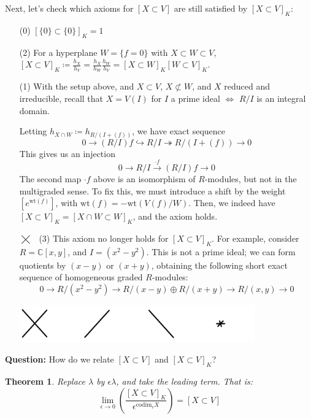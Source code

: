 \documentclass[12pt]{amsart}
\numberwithin{equation}{section}
\newtheorem{Theorem}[equation]{Theorem}
\theoremstyle{definition}
\numberwithin{figure}{section}
\newcommand{\wt}{\text{wt}}
\newcommand{\C}{\mathbb{C}}
\begin{document}
\noindent Next, let's check which axioms for $[X \subset V]$ are still satisfied by $[X \subset V]_K$:
\begin{enumerate}
    \item[\checkmark (0)] $[\{0\} \subset \{0\}]_K = 1$
    \item [\checkmark (2)] For a hyperplane $W = \{f=0\}$ with $X \subset W \subset V$, $[X \subset V]_K \coloneqq \frac{h_X}{h_V} = \frac{h_X}{h_W} \frac{h_W}{h_V} = [X \subset W]_K [W \subset V]_K$.
    \item[\checkmark (1)] With the setup above, and $X \subset V$, $X \not \subset W$, and $X$ reduced and irreducible, recall that $X = V(I)$ for $I$ a prime ideal $\iff$ $R/I$ is an integral domain.
    
    Letting $h_{X \cap W} \coloneqq h_{R/(I+(f))}$, we have exact sequence
    $$ 0 \to (R/I)f \hookrightarrow R/I \twoheadrightarrow R/(I + (f)) \to 0 $$
    This gives us an injection
    $$ 0 \to R/I \stackrel{\cdot f}{\to} (R/I)f \to 0 $$
    The second map $\cdot f$ above is an isomorphism of $R$-modules, but not in the multigraded sense. To fix this, we must introduce a shift by the weight $[e^{\wt(f)}]$, with $\wt(f) = -\wt(V(f)/W)$.
    Then, we indeed have $[X \subset V]_K = [X \cap W \subset W]_K$, and the axiom holds.
    
    \item[$\bigtimes$ \, (3)] This axiom no longer holds for $[X \subset V]_K$. For example, consider $R = \C[x,y]$, and $I = (x^2 - y^2)$. This is not a prime ideal; we can form quotients by $(x-y)$ or $(x+y)$, obtaining the following short exact sequence of    homogeneous graded $R$-modules:
    $$ 0 \to R/(x^2-y^2) \to R/(x-y) \oplus R/(x+y) \to R/(x,y) \to 0 $$
\centerline{\includegraphics[width=4in]{5.1.jpeg}}

\end{enumerate}
\vspace{1em}
\textbf{Question:} How do we relate $[X \subset V]$ and $[X \subset V]_K$?
\begin{Theorem}
Replace $\lambda$ by $\epsilon \lambda$, and take the leading term. That is:
$$ \lim_{\epsilon \to 0} \left( \frac{[X \subset V]_K}{\epsilon^{\text{codim}_v X}} \right) = [X \subset V] $$
\end{Theorem}
\end{document}
